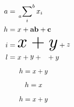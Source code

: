 \documentclass{article}
\begin{document}
\[\begin{aligned}
a &= \sideset{_a}{^b}\sum_i x_i\\
h &= \mbox{$x$} + \text{\textbf{ab}} + \textbf{c}\\
i &= \resizebox{2cm}{!}{$x+y$} + \raisebox{1pt}{$z$}\\
l &= \hbox{$x$} + \vcenter{\hbox{$y$}} + \phantom{x} + \smash{y}
\end{aligned}\]
\begin{align}
h &= \scalebox{0.95}{$x+y$}
\end{align}
\begin{equation}
\begin{aligned}
h &= \scalebox{0.95}{$x$}
\end{aligned}
\end{equation}
\[
\begin{aligned}
h &= \scalebox{0.95}{$x+y$}
\end{aligned}
\]
\end{document}
